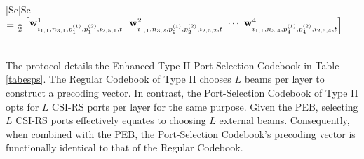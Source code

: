 \documentclass[lettersize,journal]{IEEEtran}
\begin{document}
\begin{appendices}
\begin{table}[t]
\begin{tabular}{|Sc|Sc|}
{{$= \frac{1}{2}
\begin{bmatrix} {\bf{w}}^1_{i_{1,1},n_{3,1},p^{(1)}_1,p^{(2)}_1,i_{2,5,1},t}  \ \ {\bf{w}}^2_{i_{1,1},n_{3,2},p^{(1)}_2,p^{(2)}_2,i_{2,5,2},t}  \ \cdots \
{\bf{w}}^4_{i_{1,1},n_{3,4},p^{(1)}_4,p^{(2)}_4,i_{2,5,4},t}
\end{bmatrix}$} }\\
\hline
{}\\ 
\hline
\end{tabular}  
\vspace{-8pt}
\end{table} 

The protocol details the Enhanced Type II Port-Selection Codebook in Table \ref{tabesps}. The Regular Codebook of Type II chooses $L$ beams per layer to construct a precoding vector. In contrast, the Port-Selection Codebook of Type II opts for $L$ CSI-RS ports per layer for the same purpose. Given the PEB, selecting $L$ CSI-RS ports effectively equates to choosing $L$ external beams. Consequently, when combined with the PEB, the Port-Selection Codebook's precoding vector is functionally identical to that of the Regular Codebook. 


\end{appendices}
\end{document}
